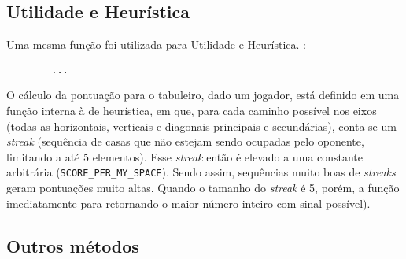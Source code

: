 \documentclass{article}
\newcommand{\todo}[1]{{\color{red}{#1}}}
\newcommand{\rustinline}[1]{\texttt{#1}}
\begin{document}
    \todo{Provavelmente vai ficar embutido nos outros tópicos.}
    \todo{AVANÇA NESSA CAVALA IMUNDA.}

    \subsection{Utilidade e Heurística}

    Uma mesma função foi utilizada para Utilidade e Heurística. \todo{O
    resultado dessa função é apenas a diferença da pontuação do jogador atual
    com a do oponente para o tabuleiro dado}:

    \begin{verbatim}
        ...
    \end{verbatim}

    O cálculo da pontuação para o tabuleiro, dado um jogador, está definido em
    uma função interna à de heurística, em que, para cada caminho possível nos
    eixos (todas as horizontais, verticais e diagonais principais e
    secundárias), conta-se um \textit{streak} (sequência de casas que não
    estejam sendo ocupadas pelo oponente, limitando a até 5 elementos). Esse
    \textit{streak} então é elevado a uma constante arbitrária
    (\rustinline{SCORE_PER_MY_SPACE}). Sendo assim, sequências muito boas de
    \textit{streaks} geram pontuações muito altas. Quando o tamanho do
    \textit{streak} é 5, porém, a função imediatamente para retornando o maior
    número inteiro com sinal possível).


    \todo{Tiz, descreve aqui bonitinho as heurísticas. AVANÇA NESSA CAVALA
    IMUNDA.}

    \subsection{Outros métodos}
\end{document}
